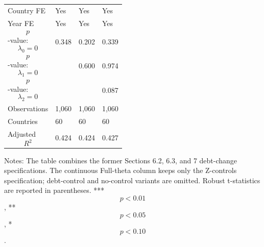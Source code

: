 \begin{table}[H]
\begin{threeparttable}
\begin{tabularx}{\textwidth}{lYYY}
Country FE & Yes & Yes & Yes \\
Year FE & Yes & Yes & Yes \\
$$p$$-value: $$\lambda_0=0$$ & 0.348 & 0.202 & 0.339 \\
$$p$$-value: $$\lambda_1=0$$ &  & 0.600 & 0.974 \\
$$p$$-value: $$\lambda_2=0$$ &  &  & 0.087 \\
Observations & 1,060 & 1,060 & 1,060 \\
Countries & 60 & 60 & 60 \\
Adjusted $$R^2$$ & 0.424 & 0.424 & 0.427 \\
\bottomrule
\end{tabularx}
\begin{tablenotes}[flushleft]\footnotesize
\item Notes: The table combines the former Sections 6.2, 6.3, and 7 debt-change specifications. The continuous Full-theta column keeps only the Z-controls specification; debt-control and no-control variants are omitted. Robust t-statistics are reported in parentheses. *** $$p<0.01$$, ** $$p<0.05$$, * $$p<0.10$$.
\end{tablenotes}
\end{threeparttable}
\end{table}
